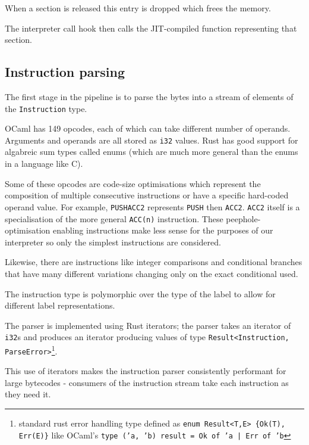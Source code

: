 When a section is released this entry is dropped which frees the memory.

The interpreter call hook then calls the JIT-compiled function representing that section.

\subsection{Instruction parsing}

The first stage in the pipeline is to parse the bytes into a stream of elements of the
\texttt{Instruction} type.

\label{instruction-type}

OCaml has 149 opcodes, each of which can take different number of operands. Arguments and operands
are all stored as \texttt{i32} values. Rust has good support for algabreic sum types called enums
(which are much more general than the enums in a language like C).

Some of these opcodes are code-size optimisations which represent the composition of multiple
consecutive instructions or have a specific hard-coded operand value. For example,
\texttt{PUSHACC2} represents \texttt{PUSH} then \texttt{ACC2}. \texttt{ACC2} itself is a
specialisation of the more general \texttt{ACC(n)} instruction. These peephole-optimisation
enabling instructions make less sense for the purposes of our interpreter so only the simplest
instructions are considered.

Likewise, there are instructions like integer comparisons and conditional branches that have many
different variations changing only on the exact conditional used.

The instruction type is polymorphic over the type of the label to allow for different label
representations.


The parser is implemented using Rust iterators; the parser takes an iterator of \texttt{i32}s and
produces an iterator producing values of type \texttt{Result<Instruction,
      ParseError>}\footnote{standard rust error handling type defined as \texttt{enum Result<T,E>
            \{Ok(T), Err(E)\}} like OCaml's \texttt{type ('a, 'b) result = Ok of 'a | Err of 'b}}.

This use of iterators makes the instruction parser consistently performant for large bytecodes -
consumers of the instruction stream take each instruction as they need it.

